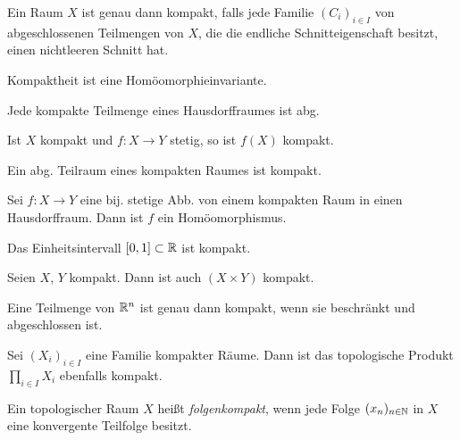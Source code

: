 \documentclass{cheat-sheet}
\begin{document}
\begin{prop}
  Ein Raum $X$ ist genau dann kompakt, falls jede Familie $(C_i)_{i \in I}$ von abgeschlossenen Teilmengen von $X$, die die endliche Schnitteigenschaft besitzt, einen nichtleeren Schnitt hat. %
\end{prop}

\begin{bem}
  Kompaktheit ist eine Homöomorphieinvariante.
\end{bem}

\begin{prop}
  Jede kompakte Teilmenge eines Hausdorffraumes ist abg.
\end{prop}

\begin{prop}
  Ist $X$ kompakt und $f : X \to Y$ stetig, so ist $f(X)$ kompakt.
\end{prop}

\begin{prop}
  Ein abg. Teilraum eines kompakten Raumes ist kompakt.
\end{prop}

\begin{prop}
  Sei $f : X \to Y$ eine bij. stetige Abb. von einem kompakten Raum in einen Hausdorffraum. Dann ist $f$ ein Homöomorphismus.
\end{prop}


\begin{prop}
  Das Einheitsintervall $\left[ 0, 1 \right] \subset \mathbb{R}$ ist kompakt.
\end{prop}

\begin{prop}
  Seien $X$, $Y$ kompakt. Dann ist auch $(X \times Y)$ kompakt.
\end{prop}

\begin{satz}
  Eine Teilmenge von $\mathbb{R}^n$ ist genau dann kompakt, wenn sie beschränkt und abgeschlossen ist.
\end{satz}

\begin{satz}
  Sei $(X_i)_{i \in I}$ eine Familie kompakter Räume. Dann ist das topologische Produkt $\prod_{i \in I} X_i$ ebenfalls kompakt.
\end{satz}

\begin{defn}
  Ein topologischer Raum $X$ heißt \emph{folgenkompakt}, wenn jede Folge $(x_n)_{n \in \mathbb{N}}$ in $X$ eine konvergente Teilfolge besitzt.
\end{defn}
\end{document}
